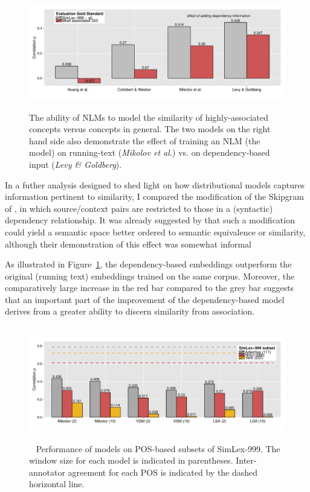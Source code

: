 \begin{figure}[]  \includegraphics[width = \textwidth,height=5cm]{Chapter_2/Figure_3A_CL}  \caption{\label{fig9} The ability of NLMs to model the similarity of highly-associated concepts versus concepts in general. The two models on the right hand side also demonstrate the effect of training an NLM (the \protect\cite{mikolov2013efficient} model) on running-text (\emph{Mikolov et al.}) vs. on dependency-based input (\emph{Levy \& Goldberg}).}\end{figure}

In a futher analysis designed to shed light on how distributional models captures information pertinent to similarity, I compared the modification of the Skipgram of \cite{levy2014dependency}, in which source/context pairs are restricted to those in a (syntactic) dependency relationship. It was already suggested by \cite{levy2014dependency} that such a modification could yield a semantic space better ordered to semantic equivalence or similarity, although their demonstration of this effect was somewhat informal 

As illustrated in Figure~\ref{fig9}, the dependency-based embeddings outperform the original (running text) embeddings trained on the same corpus. Moreover, the comparatively large increase in the red bar compared to the grey bar suggests that an important part of the improvement of the dependency-based model derives from a greater ability to discern similarity from association. 

\begin{figure}[]  \includegraphics[width = \textwidth,height=5cm]{Chapter_2/Figure_5_CL}  \caption{~\label{fig11} Performance of models on POS-based subsets of SimLex-999. The window size for each model is indicated in parentheses. Inter-annotator agreement for each POS is indicated by the dashed horizontal line.}\end{figure}


